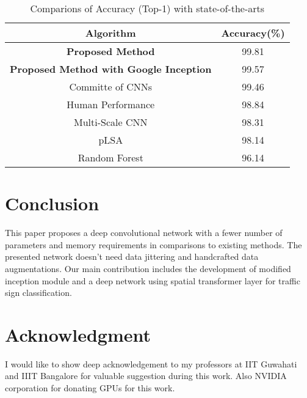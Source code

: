 \documentclass[conference]{IEEEtran}
\begin{document}
\begin{table}[h]
\caption{Comparions of Accuracy (Top-1) with state-of-the-arts}
\label{tab:accuracy}
\begin{center}
\begin{tabular}{|c|c|}
\hline
Algorithm & Accuracy(\%)\\
\hline
\textbf{Proposed Method} & 99.81 \\
\hline
\textbf{Proposed Method with Google Inception} & 99.57\\
\hline
Committe of CNNs \cite{committe} & 99.46\\
\hline
Human Performance \cite{gtsrb} & 98.84\\
\hline
Multi-Scale CNN \cite{multi} & 98.31\\
\hline
pLSA \cite{plsa} & 98.14\\
\hline
Random Forest \cite{rf} & 96.14\\
\hline
\end{tabular}
\end{center}
\end{table}


\section{Conclusion}
 This paper proposes a deep convolutional network with a fewer number of parameters and memory requirements in comparisons to existing methods. The presented network doesn't need data jittering and handcrafted data augmentations. Our main contribution includes the development of modified inception module and a deep network using spatial transformer layer for traffic sign classification.


\section*{Acknowledgment}
I would like to show deep acknowledgement to my professors at IIT Guwahati and IIIT Bangalore for valuable suggestion during this work. Also NVIDIA corporation for donating GPUs for this work.





\end{document}
